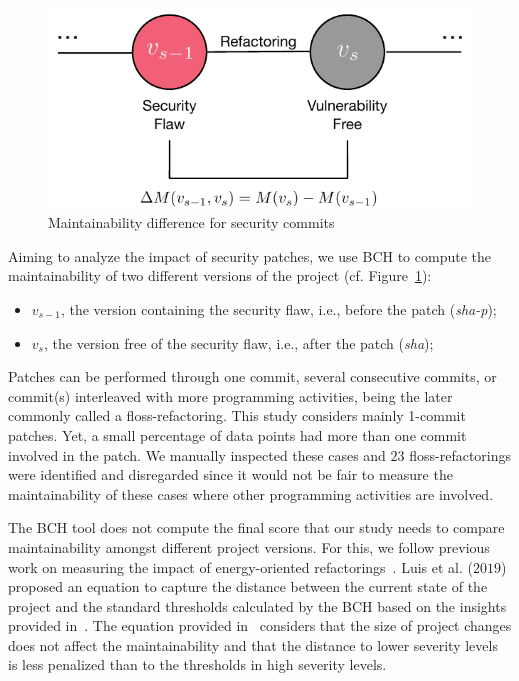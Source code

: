 \documentclass[10pt,conference]{IEEEtran}
\begin{document}
\begin{figure}[h]
 	\centering 	
	\includegraphics[width=0.6\linewidth]{figures/commit.pdf}
 	\caption{Maintainability difference for security commits}
	\label{fig:commit}
\end{figure}

Aiming to analyze the impact of security patches, we use BCH to compute the
maintainability of two different versions of the project (cf. Figure~\ref{fig:commit}):

\begin{itemize}
	\item $v_{s-1}$, the version containing the security flaw, i.e., before the
	patch (\emph{sha-p});
	\item $v_{s}$, the version free of the security flaw, i.e., after the
	patch (\emph{sha});
\end{itemize}

Patches can be performed through one commit, several consecutive commits, or 
commit(s) interleaved with more programming activities, being the later
commonly called a floss-refactoring. This study considers mainly 1-commit 
patches. Yet, a small percentage of data points had more than one commit 
involved in the patch. We manually inspected these cases and $23$ 
floss-refactorings were identified and disregarded since it would not
be fair to measure the maintainability of these cases where other
programming activities are involved.

The BCH tool does not compute the final score that our study needs to compare
maintainability amongst different project versions. For this, we follow previous 
work on measuring the impact of energy-oriented 
refactorings~\cite{cruz2019energyoriented}. Luis et al. ($2019$) proposed an 
equation to capture the distance between the current state of the project and
the standard thresholds calculated by the BCH based on the insights provided 
in~\cite{Olivari:2018}. The equation provided in~\cite{cruz2019energyoriented} 
considers that the size of project changes does not affect the maintainability 
and that the distance to lower severity levels is less penalized than to the
thresholds in high severity levels.
\end{document}
